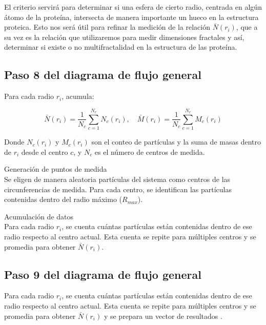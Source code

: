 	 El criterio  servir\'{a} para determinar si una esfera de cierto radio, centrada en alg\'{u}n \'{a}tomo de la prote\'{i}na, intersecta de manera importante un hueco en la estructura proteica. Esto nos ser\'{a} \'{u}til para refinar la medici\'{o}n de la relaci\'{o}n $\bar N(r_i)$, que a su vez es la relaci\'{o}n que utilizaremos para medir dimensiones fractales y as\'{i}, determinar si existe o no multifractalidad en la estructura de las prote\'{i}na.
	 

	\subsection{Paso 8 del diagrama de flujo general}
 
	Para cada radio \(r_i\), acumula:
	
	\begin{equation}
			\bar{N}(r_i) = \frac{1}{N_c} \sum_{c=1}^{N_c} N_c(r_i), \quad
		\bar{M}(r_i) = \frac{1}{N_c} \sum_{c=1}^{N_c} M_c(r_i)
	\end{equation}

	Donde \(N_c(r_i)\) y \(M_c(r_i)\) son el conteo de partículas y la suma de masas 
	dentro de \(r_i\) desde el centro \(c\), y \(N_c\) es el número de centros de medida.

	 Generaci\'{o}n de puntos de medida\\
	Se eligen de manera aleatoria part\'{i}culas del sistema como centros de las circunferencias de medida. Para cada centro, se identifican las part\'{i}culas contenidas dentro del radio m\'{a}ximo (\(R_{max}\)).
	
	Acumulaci\'{o}n de datos\\
	Para cada radio \( r_i \), se cuenta cu\'{a}ntas part\'{i}culas est\'{a}n contenidas dentro de ese radio respecto al centro actual. Esta cuenta se repite para m\'{u}ltiples centros y se promedia para obtener \(\bar{N}(r_i)\).


 	
 	\subsection{Paso 9 del diagrama de flujo general}
 		

 	Para cada radio \( r_i \), se cuenta cu\'{a}ntas part\'{i}culas est\'{a}n contenidas dentro de ese radio respecto al centro actual. Esta cuenta se repite para m\'{u}ltiples centros y se promedia para obtener \( \bar{N}(r_i) \)	y se prepara un vector de resultados .
 
 
 	\clearpage
 
